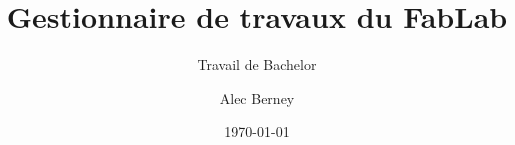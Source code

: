 \author{Alec Berney}


\title{Gestionnaire de travaux du FabLab}

\subtitle{Travail de Bachelor}


\date{\today}



